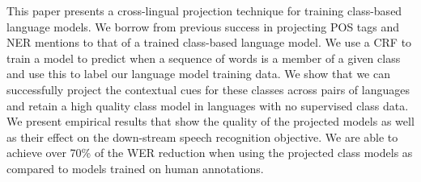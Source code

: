 This paper presents a cross-lingual projection technique for training class-based language models.  We borrow from previous success in projecting POS tags and NER mentions to that of a trained class-based language model. We use a CRF to train a model to predict when a sequence of words is a member of a given class and use this to label our language model training data.  We show that we can successfully project the contextual cues for these classes across pairs of languages and retain a high quality class model in languages with no supervised class data.  We present empirical results that show the quality of the projected models as well as their effect on the down-stream speech recognition objective.  We are able to achieve over 70\% of the WER reduction when using the projected class models as compared to models trained on human annotations.
